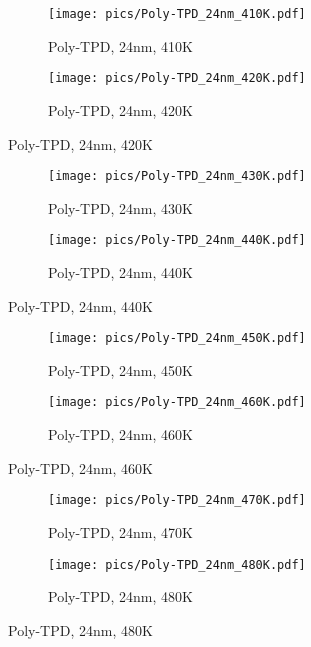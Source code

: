 \begin{figure}[!htb]
\centering
\begin{subfigure}[t]{.5\textwidth}
  \centering
  \texttt{[image: pics/Poly-TPD\_24nm\_410K.pdf]}
  \caption{Poly-TPD, 24nm, 410K}
  \label{fig:sub65}
\end{subfigure}%
\begin{subfigure}[t]{.5\textwidth}
  \centering
  \texttt{[image: pics/Poly-TPD\_24nm\_420K.pdf]}
  \caption{Poly-TPD, 24nm, 420K}
  \label{fig:sub66}
\end{subfigure}%
\end{figure}

\begin{figure}[!htb]
\centering
\begin{subfigure}[t]{.5\textwidth}
  \centering
  \texttt{[image: pics/Poly-TPD\_24nm\_430K.pdf]}
  \caption{Poly-TPD, 24nm, 430K}
  \label{fig:sub67}
\end{subfigure}%
\begin{subfigure}[t]{.5\textwidth}
  \centering
  \texttt{[image: pics/Poly-TPD\_24nm\_440K.pdf]}
  \caption{Poly-TPD, 24nm, 440K}
  \label{fig:sub68}
\end{subfigure}%
\end{figure}

\begin{figure}[!htb]
\centering
\begin{subfigure}[t]{.5\textwidth}
  \centering
  \texttt{[image: pics/Poly-TPD\_24nm\_450K.pdf]}
  \caption{Poly-TPD, 24nm, 450K}
  \label{fig:sub69}
\end{subfigure}%
\begin{subfigure}[t]{.5\textwidth}
  \centering
  \texttt{[image: pics/Poly-TPD\_24nm\_460K.pdf]}
  \caption{Poly-TPD, 24nm, 460K}
  \label{fig:sub70}
\end{subfigure}%
\end{figure}

\begin{figure}[!htb]
\centering
\begin{subfigure}[t]{.5\textwidth}
  \centering
  \texttt{[image: pics/Poly-TPD\_24nm\_470K.pdf]}
  \caption{Poly-TPD, 24nm, 470K}
  \label{fig:sub71}
\end{subfigure}%
\begin{subfigure}[t]{.5\textwidth}
  \centering
  \texttt{[image: pics/Poly-TPD\_24nm\_480K.pdf]}
  \caption{Poly-TPD, 24nm, 480K}
  \label{fig:sub72}
\end{subfigure}%
\end{figure}

